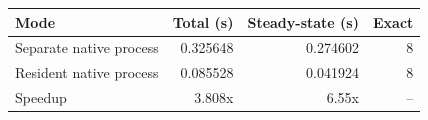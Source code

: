 {\small
\begin{tabular}{lrrr}
\hline
Mode & Total (s) & Steady-state (s) & Exact \\
\hline
Separate native process & 0.325648 & 0.274602 & 8 \\
Resident native process & 0.085528 & 0.041924 & 8 \\
Speedup & 3.808x & 6.55x & -- \\
\hline
\end{tabular}
}

